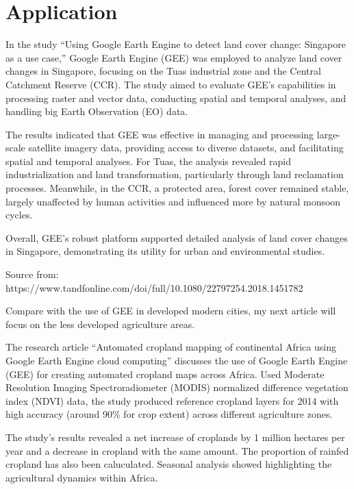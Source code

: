 \documentclass[
  letterpaper,
  DIV=11,
  numbers=noendperiod]{scrreprt}
\begin{document}

\chapter{Application}\label{application-4}

In the study ``Using Google Earth Engine to detect land cover change:
Singapore as a use case,'' Google Earth Engine (GEE) was employed to
analyze land cover changes in Singapore, focusing on the Tuas industrial
zone and the Central Catchment Reserve (CCR). The study aimed to
evaluate GEE's capabilities in processing raster and vector data,
conducting spatial and temporal analyses, and handling big Earth
Observation (EO) data.

The results indicated that GEE was effective in managing and processing
large-scale satellite imagery data, providing access to diverse
datasets, and facilitating spatial and temporal analyses. For Tuas, the
analysis revealed rapid industrialization and land transformation,
particularly through land reclamation processes. Meanwhile, in the CCR,
a protected area, forest cover remained stable, largely unaffected by
human activities and influenced more by natural monsoon cycles.

Overall, GEE's robust platform supported detailed analysis of land cover
changes in Singapore, demonstrating its utility for urban and
environmental studies.

Source from:
https://www.tandfonline.com/doi/full/10.1080/22797254.2018.1451782

Compare with the use of GEE in developed modern cities, my next article
will focus on the less developed agriculture areas.

The research article ``Automated cropland mapping of continental Africa
using Google Earth Engine cloud computing'' discusses the use of Google
Earth Engine (GEE) for creating automated cropland maps across Africa.
Used Moderate Resolution Imaging Spectroradiometer (MODIS) normalized
difference vegetation index (NDVI) data, the study produced reference
cropland layers for 2014 with high accuracy (around 90\% for crop
extent) across different agriculture zones.

The study's results revealed a net increase of croplands by 1 million
hectares per year and a decrease in cropland with the same amount. The
proportion of rainfed cropland has also been caluculated. Seasonal
analysis showed highlighting the agricultural dynamics within Africa.
\end{document}
